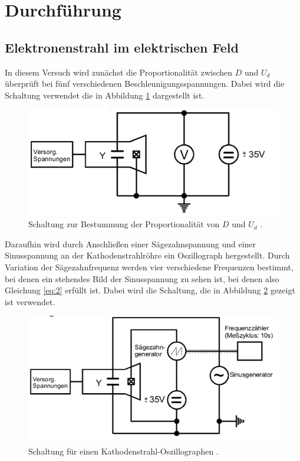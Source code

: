 \section{Durchführung}

\subsection{Elektronenstrahl im elektrischen Feld}

In diesem Versuch wird zunächst die Proportionalität zwischen $D$ und $U_d$
überprüft bei fünf verschiedenen Beschleunigungsspannungen. Dabei wird die Schaltung
verwendet die in Abbildung \ref{abb:3} dargestellt ist.

\begin{figure}[H]
  \centering
  \includegraphics[width=\textwidth]{content/Schaltung1.png}
  \caption{Schaltung zur Bestummung der Proportionalität von $D$ und $U_d$ \cite{1}.}
  \label{abb:3}
\end{figure}

Daraufhin wird durch Anschließen einer Sägezahnspannung und einer Sinusspannung an
der Kathodenstrahlröhre ein Oszillograph hergestellt. Durch Variation der Sägezahnfrequenz
werden vier verschiedene Frequenzen bestimmt, bei denen ein stehendes Bild der Sinusspannung
zu sehen ist, bei denen also Gleichung \ref{eq:2} erfüllt ist. Dabei wird die Schaltung, die in
Abbildung \ref{abb:4} gezeigt ist verwendet.

\begin{figure}[H]
  \centering
  \includegraphics[width=\textwidth]{content/Schaltung2.png}
  \caption{Schaltung für einen Kathodenstrahl-Oszillographen \cite{1}.}
  \label{abb:4}
\end{figure}

